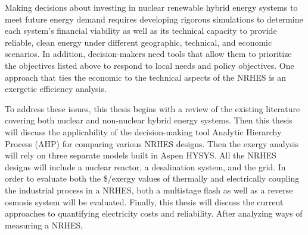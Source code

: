 \documentclass[12pt]{UIdahoMastersThesis}
\begin{document}
Making decisions about investing in nuclear renewable hybrid energy systems to meet future energy demand requires developing rigorous simulations to determine each system's financial viability as well as its technical capacity to provide reliable, clean energy under different geographic, technical, and economic scenarios. In addition, decision-makers need tools that allow them to prioritize the objectives listed above to respond to local needs and policy objectives. One approach that ties the economic to the technical aspects of the NRHES is an exergetic efficiency analysis.


To address these issues, this thesis begins with a review of the existing literature covering both nuclear and non-nuclear hybrid energy systems.  Then this thesis will discuss the applicability of the decision-making tool Analytic Hierarchy Process (AHP) for comparing various NRHES designs.  Then the exergy analysis will rely on three separate models built in Aspen HYSYS. All the NRHES designs will include a nuclear reactor, a desalination system, and the grid. In order to evaluate both the \$/exergy values of thermally and electrically coupling the industrial process in a NRHES, both a multistage flash as well as a reverse osmosis system will be evaluated.
Finally, this thesis will discuss the current approaches to quantifying electricity costs and reliability. After analyzing ways of measuring a NRHES,
\end{document}
